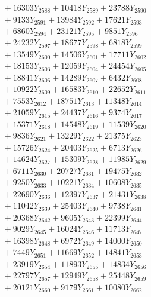 \documentclass[a4paper,10pt]{article}
\begin{document}
{\begin{align}
&\;  + 16303 Y_{2588} + 10418 Y_{2589} + 23788 Y_{2590} \\[0.3ex]
&\;  + 9133 Y_{2591} + 13984 Y_{2592} + 17621 Y_{2593} \\[0.3ex]
&\;  + 6860 Y_{2594} + 23121 Y_{2595} + 9851 Y_{2596} \\[0.3ex]
&\;  + 24232 Y_{2597} + 18677 Y_{2598} + 6818 Y_{2599} \\[0.3ex]
&\;  + 13549 Y_{2600} + 14506 Y_{2601} + 17711 Y_{2602} \\[0.3ex]
&\;  + 18153 Y_{2603} + 12059 Y_{2604} + 24454 Y_{2605} \\[0.3ex]
&\;  + 18841 Y_{2606} + 14289 Y_{2607} + 6432 Y_{2608} \\[0.5ex]\allowbreak
&\;  + 10922 Y_{2609} + 16583 Y_{2610} + 22652 Y_{2611} \\[0.3ex]
&\;  + 7553 Y_{2612} + 18751 Y_{2613} + 11348 Y_{2614} \\[0.3ex]
&\;  + 21059 Y_{2615} + 24437 Y_{2616} + 9374 Y_{2617} \\[0.3ex]
&\;  + 15371 Y_{2618} + 14548 Y_{2619} + 11539 Y_{2620} \\[0.3ex]
&\;  + 9836 Y_{2621} + 13229 Y_{2622} + 21375 Y_{2623} \\[0.3ex]
&\;  + 15726 Y_{2624} + 20403 Y_{2625} + 6713 Y_{2626} \\[0.3ex]
&\;  + 14624 Y_{2627} + 15309 Y_{2628} + 11985 Y_{2629} \\[0.3ex]
&\;  + 6711 Y_{2630} + 20727 Y_{2631} + 19475 Y_{2632} \\[0.3ex]
&\;  + 9250 Y_{2633} + 10221 Y_{2634} + 10608 Y_{2635} \\[0.3ex]
&\;  + 22690 Y_{2636} + 12397 Y_{2637} + 21431 Y_{2638} \\[0.5ex]\allowbreak
&\;  + 11042 Y_{2639} + 25403 Y_{2640} + 9738 Y_{2641} \\[0.3ex]
&\;  + 20368 Y_{2642} + 9605 Y_{2643} + 22399 Y_{2644} \\[0.3ex]
&\;  + 9029 Y_{2645} + 16024 Y_{2646} + 11713 Y_{2647} \\[0.3ex]
&\;  + 16398 Y_{2648} + 6972 Y_{2649} + 14000 Y_{2650} \\[0.3ex]
&\;  + 7449 Y_{2651} + 11669 Y_{2652} + 14841 Y_{2653} \\[0.3ex]
&\;  + 23919 Y_{2654} + 11893 Y_{2655} + 14834 Y_{2656} \\[0.3ex]
&\;  + 22797 Y_{2657} + 12949 Y_{2658} + 25448 Y_{2659} \\[0.3ex]
&\;  + 20121 Y_{2660} + 9179 Y_{2661} + 10080 Y_{2662} \\[0.3ex]

\end{align}}
\end{document}
